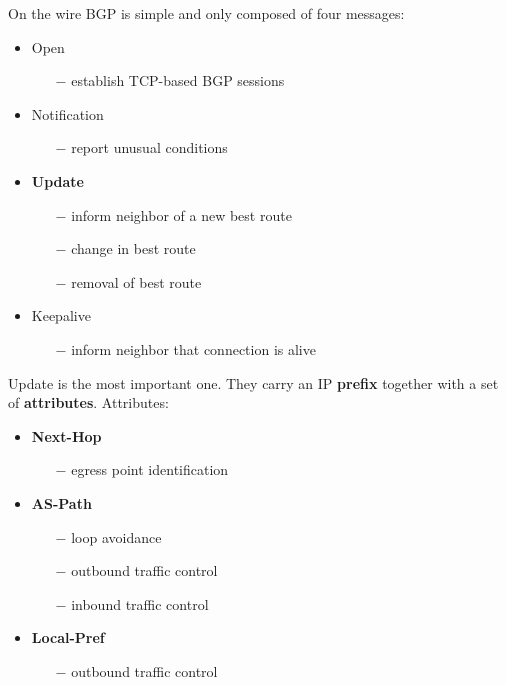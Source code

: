 \documentclass[a4paper, fontsize=8pt, landscape, DIV=1]{scrartcl}
\begin{document}
\begin{multicols*}{4}
\begin{itemize}[noitemsep]
\begin{itemize}
 			\end{itemize}
 		\end{itemize}        
		On the wire BGP is simple and only composed of four messages: 
		\begin{itemize}[noitemsep]
			\item Open 
			\begin{itemize}
				\item[$-$] establish TCP-based BGP sessions
			\end{itemize} 
			\item Notification 
			\begin{itemize}
				\item[$-$] report unusual conditions 
			\end{itemize}
			\item \textbf{Update} 
			\begin{itemize}
				\item[$-$] inform neighbor of a new best route
				\item[$-$] change in best route
				\item[$-$] removal of best route
			\end{itemize} 
			\item Keepalive
			\begin{itemize}
				\item[$-$] inform neighbor that connection is alive
			\end{itemize}
		\end{itemize}
		Update is the most important one. They carry an IP \textbf{prefix} together with a set of \textbf{attributes}. Attributes: 
		\begin{itemize}[noitemsep]
			\item \textbf{Next-Hop}
			\begin{itemize}
				\item[$-$] egress point identification
			\end{itemize}
			\item \textbf{AS-Path}
			\begin{itemize}
				\item[$-$] loop avoidance
				\item[$-$] outbound traffic control
				\item[$-$] inbound traffic control
			\end{itemize}
			\item \textbf{Local-Pref}
			\begin{itemize}
				\item[$-$] outbound traffic control

\end{itemize}
\end{itemize}
\end{multicols*}
\end{document}
